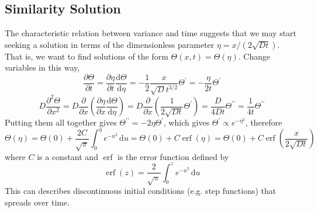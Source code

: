 \subsection{Similarity Solution}
The characteristic relation between variance and time suggests that we may start seeking a solution in terms of the dimensionless parameter $\eta=x/(2\sqrt{Dt})$.
That is, we want to find solutions of the form $\Theta(x,t)=\Theta(\eta)$.
Change variables in this way,
$$\frac{\partial\Theta}{\partial t}=\frac{\partial\eta}{\partial t}\frac{\mathrm d\Theta}{\mathrm d\eta}=-\frac{1}{2}\frac{x}{\sqrt{D}t^{3/2}}\Theta^\prime=-\frac{\eta}{2t}\Theta^\prime$$
$$D\frac{\partial^2\Theta}{\partial x^2}=D\frac{\partial}{\partial x}\left(\frac{\partial\eta}{\partial x}\frac{\mathrm d\Theta}{\mathrm d\eta}\right)=D\frac{\partial}{\partial x}\left( \frac{1}{2\sqrt{Dt}}\Theta^\prime \right)=\frac{D}{4Dt}\Theta^{\prime\prime}=\frac{1}{4t}\Theta^{\prime\prime}$$
Putting them all together gives $\Theta^{\prime\prime}=-2\eta\Theta^\prime$, which gives $\Theta^\prime\propto e^{-\eta^2}$, therefore
$$\Theta(\eta)=\Theta(0)+\frac{2C}{\sqrt{\pi}}\int_0^\eta e^{-u^2}\,\mathrm du=\Theta(0)+C\operatorname{erf}(\eta)=\Theta(0)+C\operatorname{erf}\left( \frac{x}{2\sqrt{Dt}} \right)$$
where $C$ is a constant and $\operatorname{erf}$ is the error function defined by
$$\operatorname{erf}(z)=\frac{2}{\sqrt{\pi}}\int_0^ze^{-u^2}\,\mathrm du$$
This can describes discontinuous initial conditions (e.g. step functions) that spreads over time.
